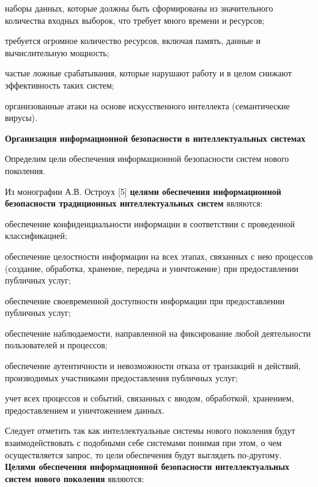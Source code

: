 \begin{textitemize}
	\item наборы данных, которые должны быть сформированы из значительного количества входных выборок, что требует много времени и ресурсов;
	\item требуется огромное количество ресурсов, включая память, данные и вычислительную мощность;
	\item частые ложные срабатывания, которые нарушают работу и в целом снижают эффективность таких систем;
	\item организованные атаки на основе искусственного интеллекта (семантические вирусы).
\end{textitemize}

\textbf{Организация информационной безопасности в интеллектуальных системах}

Определим цели обеспечения информационной безопасности систем нового поколения.

Из монографии А.В. Остроух [5] \textbf{целями обеспечения информационной безопасности традиционных интеллектуальных систем} являются:

\begin{textitemize}
	\item обеспечение конфиденциальности информации в соответствии с проведенной классификацией;
	\item обеспечение целостности информации на всех этапах, связанных с нею процессов (создание, обработка, хранение, передача и уничтожение) при предоставлении публичных услуг;
	\item обеспечение своевременной доступности информации при предоставлении публичных услуг;
	\item обеспечение наблюдаемости, направленной на фиксирование любой деятельности пользователей и процессов;
	\item обеспечение аутентичности и невозможности отказа от транзакций и действий, производимых участниками предоставления публичных услуг;
	\item учет всех процессов и событий, связанных с вводом, обработкой, хранением, предоставлением и уничтожением данных.
\end{textitemize}

Следует отметить так как интеллектуальные системы нового поколения будут взаимодействовать с подобными себе системами понимая при этом, о чем осуществляется запрос, то цели обеспечения будут выглядеть по-другому. \textbf{Целями обеспечения информационной безопасности интеллектуальных систем нового поколения} являются:

